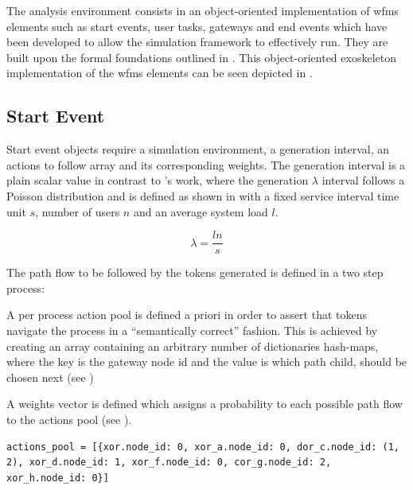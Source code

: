 The analysis environment consists in an object-oriented implementation of \gls{wfms} elements such as start events, user tasks, gateways and end events which have been developed to allow the simulation framework to effectively run. They are built upon the formal foundations outlined in . This object-oriented exoskeleton implementation of the \gls{wfms} elements can be seen depicted in .


\subsection{Start Event}

Start event objects require a simulation environment, a generation interval, an actions to follow array and its corresponding weights. The generation interval is a plain scalar value in contrast to \citet{Zeng2005}'s work, where the generation $\lambda$ interval follows a Poisson distribution and is defined as shown in  with a fixed service interval time unit $s$, number of users $n$ and an average system load $l$.

\begin{equation}
\label{eq:generation_interval}
	\lambda = \frac{l n}{s}
\end{equation}

The path flow to be followed by the tokens generated is defined in a two step process:
\begin{enumerate*}
	\item A per process action pool is defined a priori in order to assert that tokens navigate the process in a ``semantically correct'' fashion. This is achieved by creating an array containing an arbitrary number of dictionaries \ie hash-maps, where the key is the gateway node id and the value is which path \ie child, should be chosen next (see )
	\item A weights vector is defined which assigns a probability to each possible path flow to the actions pool (see ).
\end{enumerate*}

\begin{lstlisting}[caption=Actions pool,label=lst:actions_pool,style=CustomPython]
    actions_pool = [{xor.node_id: 0, xor_a.node_id: 0, dor_c.node_id: (1, 2), xor_d.node_id: 1, xor_f.node_id: 0, cor_g.node_id: 2, xor_h.node_id: 0}]
\end{lstlisting}

